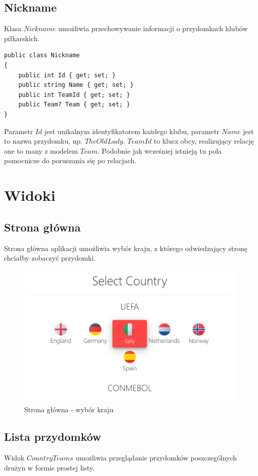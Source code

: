 \documentclass[]{article}
\begin{document}
\subsection{Nickname}
Klasa $Nickname$ umożliwia przechowywanie informacji o przydomkach klubów piłkarskich.
\begin{lstlisting}
public class Nickname
{
	public int Id { get; set; }
	public string Name { get; set; }
	public int TeamId { get; set; }
	public Team? Team { get; set; }
}
\end{lstlisting}
Parametr $Id$ jest unikalnym identyfikatorem każdego klubu, parametr $Name$ jest to nazwa przydomku, np. $The Old Lady$. $TeamId$ to klucz obcy, realizujący relację one to many z modelem $Team$. Podobnie jak wcześniej istnieją tu pola pomocnicze do poruszania się po relacjach.

\section{Widoki}

\subsection{Strona główna} \label{landing-page}
Strona główna aplikacji umożliwia wybór kraju, z którego odwiedzający stronę chciałby zobaczyć przydomki.

\begin{figure}[H]
	\centering
	\includegraphics[scale=0.38]{landing-page}
	\caption{Strona główna - wybór kraju}
\end{figure}

\subsection{Lista przydomków} \label{nicknames-view}
Widok $CountryTeams$ umożliwia przeglądanie przydomków poszczególnych drużyn w formie prostej listy.
\end{document}
